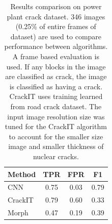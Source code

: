         
        \begin{table}
        
            \begin{center}
            
                \begin{tabular}{ l c|c|c| }\\
                    \hline
                        \multicolumn{1}{|l||}{\textbf{Method}} & \textbf{TPR} & \textbf{FPR} & \textbf{F1}\\
                    \hline
                        \multicolumn{1}{|p{2cm}||}{CNN} & 0.75 & 0.03 & 0.79 \\
                    \hline
                        \multicolumn{1}{|p{2cm}||}{CrackIT} & 0.79 & 0.60 & 0.33 \\
                    \hline
                        \multicolumn{1}{|p{2cm}||}{Morph} & 0.47 & 0.19 & 0.39 \\
                    \hline
                \end{tabular}
                
                \caption{Results comparison on power plant crack dataset. 346 images (0.25\% of entire frames of dataset) are used to compare performance between algorithms. A frame based evaluation is used. If any blocks in the image are classified as crack, the image is classified as having a crack. CrackIT uses training learned from road crack dataset. The input image resolution size was tuned for the CrackIT algorithm to account for the smaller size image and smaller thickness of nuclear cracks.}  
                \label{ResultsComparisonNuclearDataSet}
            
            \end{center}
            
        \end{table}
        
